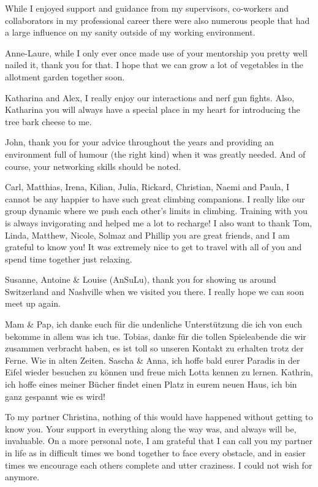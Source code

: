 \documentclass[12pt,openany]{book}
\begin{document}
While I enjoyed support and guidance from my supervisors, co-workers and
collaborators in my professional career there were also numerous people
that had a large influence on my sanity outside of my working
environment.

Anne-Laure, while I only ever once made use of your mentorship you
pretty well nailed it, thank you for that. I hope that we can grow a lot
of vegetables in the allotment garden together soon.

Katharina and Alex, I really enjoy our interactions and nerf gun fights.
Also, Katharina you will always have a special place in my heart for
introducing the tree bark cheese to me.

John, thank you for your advice throughout the years and providing an
environment full of humour (the right kind) when it was greatly needed.
And of course, your networking skills should be noted.

Carl, Matthias, Irena, Kilian, Julia, Rickard, Christian, Naemi and
Paula, I cannot be any happier to have such great climbing companions. I
really like our group dynamic where we push each other's limits in
climbing. Training with you is always invigorating and helped me a lot
to recharge! I also want to thank Tom, Linda, Matthew, Nicole, Solmaz
and Phillip you are great friends, and I am grateful to know you! It was
extremely nice to get to travel with all of you and spend time together
just relaxing.

Susanne, Antoine \& Louise (AnSuLu), thank you for showing us around
Switzerland and Nashville when we visited you there. I really hope we
can soon meet up again.

Mam \& Pap, ich danke euch für die undenliche Unterstützung die ich von
euch bekomme in allem was ich tue. Tobias, danke für die tollen
Spieleabende die wir zusammen verbracht haben, es ist toll so unseren
Kontakt zu erhalten trotz der Ferne. Wie in alten Zeiten. Sascha \&
Anna, ich hoffe bald eurer Paradis in der Eifel wieder besuchen zu
können und freue mich Lotta kennen zu lernen. Kathrin, ich hoffe eines
meiner Bücher findet einen Platz in eurem neuen Haus, ich bin ganz
gespannt wie es wird!

To my partner Christina, nothing of this would have happened without
getting to know you. Your support in everything along the way was, and
always will be, invaluable. On a more personal note, I am grateful that
I can call you my partner in life as in difficult times we bond together
to face every obstacle, and in easier times we encourage each others
complete and utter craziness. I could not wish for anymore.
\end{document}
